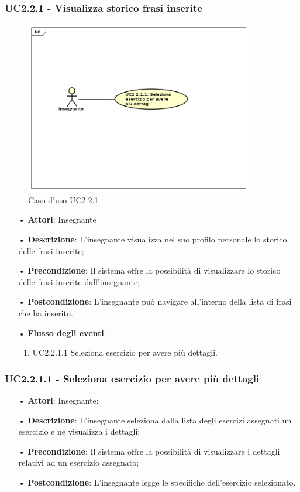 \subsubsection{UC2.2.1 - Visualizza storico frasi inserite}

\begin{figure}[H]
\centering
\includegraphics[width=10cm]{img/UC221.png} 
\caption{Caso d'uso UC2.2.1}
\end{figure}

\begin{itemize}
	\item[•] \textbf{Attori}:  Insegnante	\item[•] \textbf{Descrizione}: L’insegnante visualizza nel suo profilo personale lo storico delle frasi inserite; 
	\item[•] \textbf{Precondizione}: Il sistema offre la possibilità di visualizzare lo storico delle frasi inserite dall’insegnante;
	\item[•] \textbf{Postcondizione}:  L’insegnante può navigare all’interno della lista di frasi che ha inserito.
	\item[•] \textbf{Flusso degli eventi}:
		\begin{enumerate}
			\item UC2.2.1.1  Seleziona esercizio per avere più dettagli.
		\end{enumerate}
\end{itemize}

\subsubsection{UC2.2.1.1 - Seleziona esercizio per avere più dettagli}
\begin{itemize}
	\item[•] \textbf{Attori}: Insegnante;
	\item[•] \textbf{Descrizione}:  L’insegnante seleziona dalla lista degli esercizi assegnati un esercizio e ne visualizza i dettagli;
	\item[•] \textbf{Precondizione}: Il sistema offre la possibilità di visualizzare i dettagli relativi ad un esercizio assegnato;
	\item[•] \textbf{Postcondizione}: L’insegnante legge le specifiche dell’esercizio selezionato.
\end{itemize}

